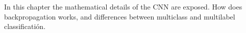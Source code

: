 In this chapter the mathematical details of the CNN are exposed. How does backpropagation works, and differences between multiclass and multilabel classificatión.